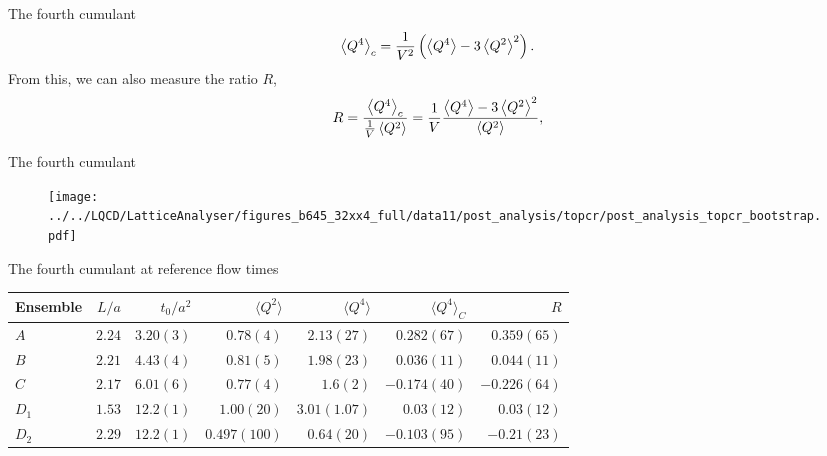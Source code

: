 \documentclass[10pt,show notes on second screen]{beamer}
\begin{document}
\begin{frame}{The fourth cumulant}
\begin{align*}
    \left\langle{Q^4}\right\rangle_c = \frac{1}{V^2}\left(\left\langle{Q^4}\right\rangle - 3\left\langle{Q^2}\right\rangle^2\right).
\end{align*}
From this, we can also measure the ratio $R$,
\begin{align*}
    R = \frac{\left\langle{Q^4}\right\rangle_c}{\frac{1}{V}\left\langle{Q^2}\right\rangle} = \frac{1}{V}\frac{\left\langle{Q^4}\right\rangle - 3\left\langle{Q^2}\right\rangle^2}{\left\langle{Q^2}\right\rangle},
\end{align*}
\end{frame}

\begin{frame}{The fourth cumulant}
\begin{figure}
    \centering
    \texttt{[image: ../../LQCD/LatticeAnalyser/figures\_b645\_32xx4\_full/data11/post\_analysis/topcr/post\_analysis\_topcr\_bootstrap.pdf]}
\end{figure}
\end{frame}

\begin{frame}{The fourth cumulant at reference flow times}
\begin{table}
    \centering
    \begin{tabular}{l r r r r r r}
        \toprule
        Ensemble & $L/a$ & $t_0/a^2$ & $\langle Q^2 \rangle$ & $\langle Q^4 \rangle$ & $\langle Q^4 \rangle_C$ & $R$             \\
        \midrule
        $A$      & $2.24$ & $3.20(3)$ & $0.78(4)$             & $2.13(27)$            & $0.282(67)$            & $0.359(65)$     \\ 
        $B$      & $2.21$ & $4.43(4)$ & $0.81(5)$             & $1.98(23)$            & $0.036(11)$            & $0.044(11)$     \\ 
        $C$      & $2.17$ & $6.01(6)$ & $0.77(4)$             & $1.6(2)$              & $-0.174(40)$           & $-0.226(64)$    \\ 
        $D_1$    & $1.53$ & $12.2(1)$ & $1.00(20)$            & $3.01(1.07)$          & $0.03(12)$             & $0.03(12)$      \\ 
        $D_2$    & $2.29$ & $12.2(1)$ & $0.497(100)$          & $0.64(20)$            & $-0.103(95)$           & $-0.21(23)$     \\ 
        \bottomrule
    \end{tabular}
\end{table}
\end{frame}
\end{document}
